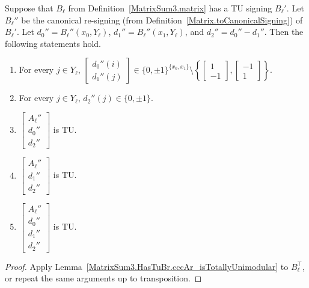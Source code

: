 \begin{lemma}
    \label{lem:three_sum_signing_B_l_props}
    \leanok
    Suppose that $B_{\ell}$ from Definition~\ref{MatrixSum3.matrix} has a TU signing $B_{\ell}'$. Let $B_{\ell}''$ be the canonical re-signing (from Definition~\ref{Matrix.toCanonicalSigning}) of $B_{\ell}'$. Let $d_{0}'' = B_{\ell}'' (x_{0}, Y_{\ell})$, $d_{1}'' = B_{\ell}'' (x_{1}, Y_{\ell})$, and $d_{2}'' = d_{0}'' - d_{1}''$. Then the following statements hold.
    \begin{enumerate}
        \item\label{item:tss_Blp_d01} For every $j \in Y_{\ell}$, $\begin{bmatrix} d_{0}'' (i) \\ d_{1}'' (j) \end{bmatrix} \in \{0, \pm 1\}^{\{x_{0}, x_{1}\}} \setminus \left\{ \begin{bmatrix} 1 \\ -1 \end{bmatrix}, \begin{bmatrix} -1 \\ 1 \end{bmatrix} \right\}$.
        \item\label{item:tss_Blp_d2} For every $j \in Y_{\ell}$, $d_{2}'' (j) \in \{0, \pm 1\}$.
        \item\label{item:tss_Blp_tu1} $\begin{bmatrix} A_{\ell}'' \\ d_{0}'' \\ d_{2}'' \end{bmatrix}$ is TU.
        \item\label{item:tss_Blp_tu2} $\begin{bmatrix} A_{\ell}'' \\ d_{1}'' \\ d_{2}'' \end{bmatrix}$ is TU.
        \item\label{item:tss_Blp_tu3} $\begin{bmatrix} A_{\ell}'' \\ d_{0}'' \\ d_{1}'' \\ d_{2}'' \end{bmatrix}$ is TU.
    \end{enumerate}
\end{lemma}

\begin{proof}
    Apply Lemma~\ref{MatrixSum3.HasTuBr.cccAr_isTotallyUnimodular} to $B_{\ell}^{\top}$, or repeat the same arguments up to transposition.
\end{proof}

